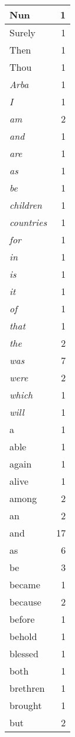 \begin{center}
\begin{longtable}{l|r}
Nun & 1\\ \hline 
Surely & 1\\ \hline 
Then & 1\\ \hline 
Thou & 1\\ \hline 
\emph{Arba} & 1\\ \hline 
\emph{I} & 1\\ \hline 
\emph{am} & 2\\ \hline 
\emph{and} & 1\\ \hline 
\emph{are} & 1\\ \hline 
\emph{as} & 1\\ \hline 
\emph{be} & 1\\ \hline 
\emph{children} & 1\\ \hline 
\emph{countries} & 1\\ \hline 
\emph{for} & 1\\ \hline 
\emph{in} & 1\\ \hline 
\emph{is} & 1\\ \hline 
\emph{it} & 1\\ \hline 
\emph{of} & 1\\ \hline 
\emph{that} & 1\\ \hline 
\emph{the} & 2\\ \hline 
\emph{was} & 7\\ \hline 
\emph{were} & 2\\ \hline 
\emph{which} & 1\\ \hline 
\emph{will} & 1\\ \hline 
a & 1\\ \hline 
able & 1\\ \hline 
again & 1\\ \hline 
alive & 1\\ \hline 
among & 2\\ \hline 
an & 2\\ \hline 
and & 17\\ \hline 
as & 6\\ \hline 
be & 3\\ \hline 
became & 1\\ \hline 
because & 2\\ \hline 
before & 1\\ \hline 
behold & 1\\ \hline 
blessed & 1\\ \hline 
both & 1\\ \hline 
brethren & 1\\ \hline 
brought & 1\\ \hline 
but & 2\\ \hline 

\end{longtable}
\end{center}
